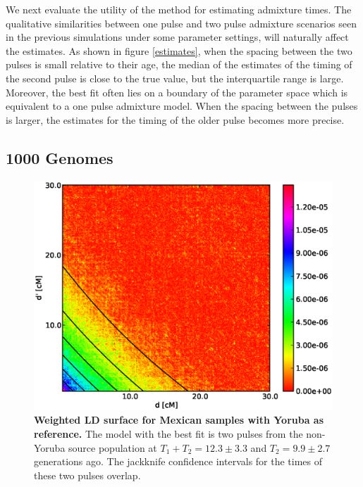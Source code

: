 \begin{table}
\begin{table}
We next evaluate the utility of the method for estimating admixture times.  The
qualitative similarities between one pulse and two pulse admixture scenarios
seen in the previous  simulations under some parameter settings, will naturally
affect  the estimates. As shown in figure \ref{estimates}, when the spacing
between the two pulses is small relative to their age, the median of the
estimates of the timing of the second pulse is close to the true value, but the
interquartile range is large. Moreover, the best fit often lies on a boundary of
the parameter space which is equivalent to a one pulse admixture model. When the
spacing between the pulses is larger, the estimates for the timing of the older
pulse becomes more precise. \subsection{1000 Genomes} \begin{figure}
\includegraphics[scale=.6]{MXL.eps} \caption{ {\bf Weighted LD surface for
Mexican samples with Yoruba as reference.} The model with the best fit is two
pulses from the non-Yoruba source population at $T_1+T_2=12.3 \pm 3.3$ and
$T_2=9.9\pm 2.7$ generations ago. The jackknife confidence intervals for the
times of these two pulses overlap. } \label{ASH_MXL} \end{figure}


\end{table}
\end{table}
